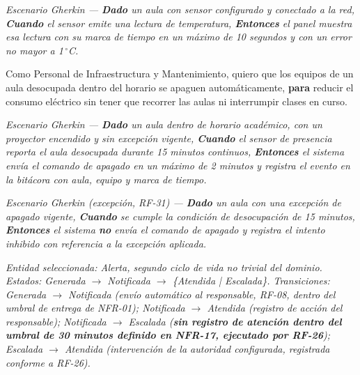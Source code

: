 \textit{Escenario Gherkin --- \textbf{Dado} un aula con sensor configurado y conectado a la red, \textbf{Cuando} el sensor emite una lectura de temperatura, \textbf{Entonces} el panel muestra esa lectura con su marca de tiempo en un m\'aximo de 10 segundos y con un error no mayor a 1\,$^{\circ}$C.}

Como Personal de Infraestructura y Mantenimiento, quiero que los equipos de un aula desocupada dentro del horario se apaguen autom\'aticamente, \textbf{para} reducir el consumo el\'ectrico sin tener que recorrer las aulas ni interrumpir clases en curso.

\textit{Escenario Gherkin --- \textbf{Dado} un aula dentro de horario acad\'emico, con un proyector encendido y sin excepci\'on vigente, \textbf{Cuando} el sensor de presencia reporta el aula desocupada durante 15 minutos continuos, \textbf{Entonces} el sistema env\'ia el comando de apagado en un m\'aximo de 2 minutos y registra el evento en la bit\'acora con aula, equipo y marca de tiempo.}

\textit{Escenario Gherkin (excepci\'on, RF-31) --- \textbf{Dado} un aula con una excepci\'on de apagado vigente, \textbf{Cuando} se cumple la condici\'on de desocupaci\'on de 15 minutos, \textbf{Entonces} el sistema \textbf{no} env\'ia el comando de apagado y registra el intento inhibido con referencia a la excepci\'on aplicada.}

\textit{Entidad seleccionada: \textit{Alerta}, segundo ciclo de vida no trivial del dominio. Estados: Generada $\rightarrow$ Notificada $\rightarrow$ \{Atendida | Escalada\}. Transiciones: Generada $\rightarrow$ Notificada (env\'io autom\'atico al responsable, RF-08, dentro del umbral de entrega de NFR-01); Notificada $\rightarrow$ Atendida (registro de acci\'on del responsable); Notificada $\rightarrow$ Escalada (\textbf{sin registro de atenci\'on dentro del umbral de 30 minutos definido en NFR-17, ejecutado por RF-26}); Escalada $\rightarrow$ Atendida (intervenci\'on de la autoridad configurada, registrada conforme a RF-26).}

